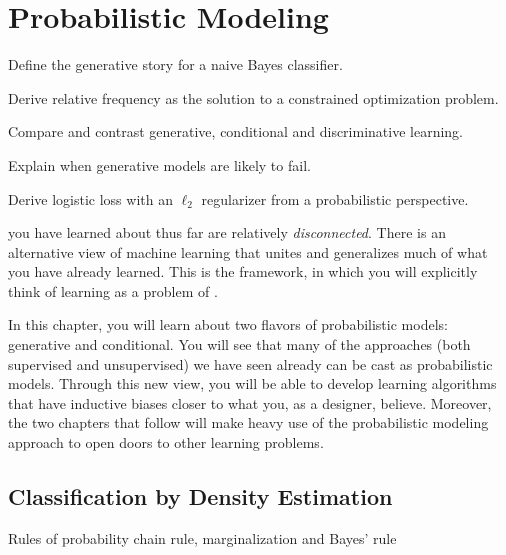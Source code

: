 \chapter{Probabilistic Modeling} \label{sec:prob}

\chapterquote{}{}

\begin{learningobjectives}
\item Define the generative story for a naive Bayes classifier.
\item Derive relative frequency as the solution to a constrained
  optimization problem.
\item Compare and contrast generative, conditional and discriminative
  learning.
\item Explain when generative models are likely to fail.
\item Derive logistic loss with an $\ell_2$ regularizer from a
  probabilistic perspective.
\end{learningobjectives}

\dependencies{}

 you have learned about
thus far are relatively \emph{disconnected}.  There is an alternative
view of machine learning that unites and generalizes much of what you
have already learned.  This is the 
framework, in which you will explicitly think of learning as a problem
of .

In this chapter, you will learn about two flavors of probabilistic
models: generative and conditional.  You will see that many of the
approaches (both supervised and unsupervised) we have seen already can
be cast as probabilistic models.  Through this new view, you will be
able to develop learning algorithms that have inductive biases closer
to what you, as a designer, believe.  Moreover, the two chapters that
follow will make heavy use of the probabilistic modeling approach to
open doors to other learning problems.

\section{Classification by Density Estimation}


\begin{mathreview}{Rules of probability}
  chain rule, marginalization and Bayes' rule
\end{mathreview}

